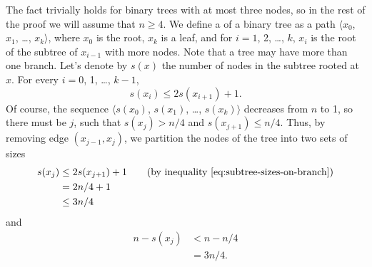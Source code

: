The fact trivially holds for binary trees with at most three nodes, so in the rest of the proof we will assume that $n\ge4$.
We define a  of a binary tree as a path $\langle x_0$, $x_1$, \dots, $x_k\rangle$, where $x_0$ is the root, $x_k$ is a leaf, and for $i=1$, 2, \dots, $k$, $x_i$ is the root of the subtree of $x_{i-1}$ with more nodes.
Note that a tree may have more than one branch.
Let's denote by $s(x)$ the number of nodes in the subtree rooted at $x$.
For every $i=0$, 1, \dots, $k-1$,
\begin{equation} \label{eq:subtree-sizes-on-branch}
    s(x_i) \le 2s(x_{i+1})+1.
\end{equation}
Of course, the sequence $\langle s(x_0)$, $s(x_1)$, \dots, $s(x_k)\rangle$ decreases from $n$ to 1, so there must be $j$, such that $s(x_j)>n/4$ and $s(x_{j+1})\le n/4$.
Thus, by removing edge $(x_{j-1},x_j)$, we partition the nodes of the tree into two sets of sizes
\begin{align*}
    s(x_j) &\le 2s(x_{j+1})+1 \tag{by inequality \eqref{eq:subtree-sizes-on-branch}} \\
    &= 2n/4+1 \\
    &\le 3n/4
\end{align*}
and
\begin{align*}
    n-s(x_j) &< n-n/4 \\
    &= 3n/4.
\end{align*}
